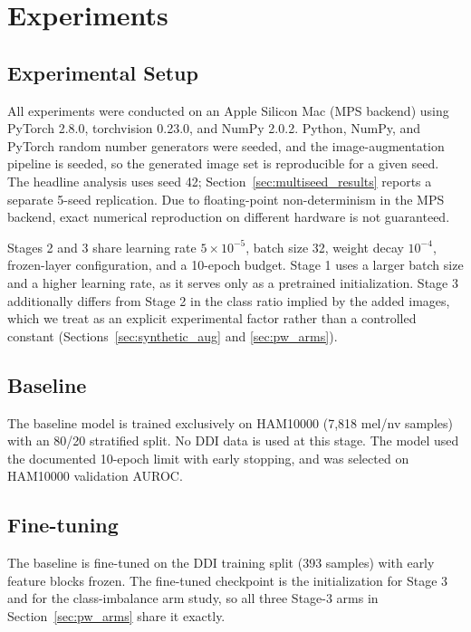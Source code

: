 \section{Experiments}

\subsection{Experimental Setup}

All experiments were conducted on an Apple Silicon Mac (MPS backend) using PyTorch 2.8.0, torchvision 0.23.0, and NumPy 2.0.2. Python, NumPy, and PyTorch random number generators were seeded, and the image-augmentation pipeline is seeded, so the generated image set is reproducible for a given seed. The headline analysis uses seed 42; Section~\ref{sec:multiseed_results} reports a separate 5-seed replication. Due to floating-point non-determinism in the MPS backend, exact numerical reproduction on different hardware is not guaranteed.

Stages 2 and 3 share learning rate $5{\times}10^{-5}$, batch size 32, weight decay $10^{-4}$, frozen-layer configuration, and a 10-epoch budget. Stage 1 uses a larger batch size and a higher learning rate, as it serves only as a pretrained initialization. Stage 3 additionally differs from Stage 2 in the class ratio implied by the added images, which we treat as an explicit experimental factor rather than a controlled constant (Sections~\ref{sec:synthetic_aug} and \ref{sec:pw_arms}).

\subsection{Baseline}

The baseline model is trained exclusively on HAM10000 (7{,}818 mel/nv samples) with an 80/20 stratified split. No DDI data is used at this stage. The model used the documented 10-epoch limit with early stopping, and was selected on HAM10000 validation AUROC.

\subsection{Fine-tuning}

The baseline is fine-tuned on the DDI training split (393 samples) with early feature blocks frozen. The fine-tuned checkpoint is the initialization for Stage 3 and for the class-imbalance arm study, so all three Stage-3 arms in Section~\ref{sec:pw_arms} share it exactly.

